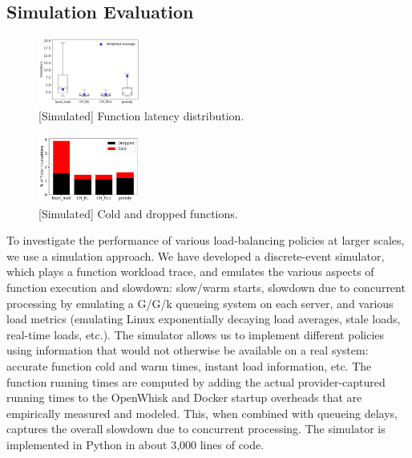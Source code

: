 \subsection{Simulation Evaluation}
\label{subsec:eval-sim}


\begin{figure}
  \centering
  \includegraphics[width=0.3\textwidth]{../figs/1k/latencies-GD.pdf}
  \caption{[Simulated] Function latency distribution. }
  \label{fig:1k-lat}
  
\end{figure}

\begin{figure}
  \centering
  \includegraphics[width=0.3\textwidth]{../figs/1k/cd-GD.pdf}
  \caption{[Simulated] Cold and dropped functions.}
  \label{fig:1k-cd}
\end{figure}



To investigate the performance of various load-balancing policies at larger scales, we use a simulation approach.
We have developed a discrete-event simulator, which plays a function workload trace, and emulates the various aspects of function execution and slowdown: slow/warm starts, slowdown due to concurrent processing by emulating a G/G/k queueing system on each server, and various load metrics (emulating Linux exponentially decaying load averages, stale loads, real-time loads, etc.). 
The simulator allows us to implement different policies using information that would not otherwise be available on a real system: accurate function cold and warm times, instant load information, etc.
The function running times are computed by adding the actual provider-captured running times to the OpenWhisk and Docker startup overheads that are empirically measured and modeled.
This, when combined with queueing delays, captures the overall slowdown due to concurrent processing.
The simulator is implemented in Python in about 3,000 lines of code. 

